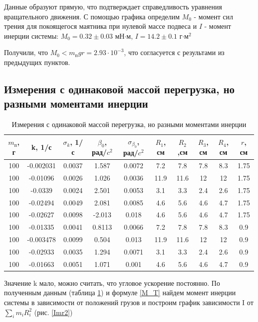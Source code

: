 \documentclass[a4paper,12pt]{article} %
\begin{document}
Данные образуют прямую, что подтверждает справедливость уравнения вращательного движения. С помощью графика определим $M_0$ - момент сил трения для покоящегося маятника при нулевой массе подвеса и $I$ - момент инерции системы: $M_0 = 0.32 \pm 0.03 $ мН$\cdot$м, $I = 14.2 \pm 0.1$ г$\cdot \text{м}^2$

Получили, что $M_0 < m_\text{п}gr=2.93 \cdot 10^{-3}$, что согласуется с результами из предыдущих пунктов.

\subsection{Измерения с одинаковой массой перегрузка, но разными моментами инерции}

\begin{table}
\caption{Измерения с одинаковой массой перегрузка, но разными моментами инерции}
\label{mconst}
\begin{tabular}{|c|c|c|c|c|c|c|c|c|c|}
\hline 
$m_\text{п}$, г & k, 1/с & $\sigma_k$, 1/с & $\beta_0$, рад/$c^2$ & $\sigma_{\beta_0}$, рад/$c^2$ & $R_1$, см & $R_2$,см & $R_3$, см & $R_4$, см & $r$, см \\
\hline
100 & -0.002031 & 0.0037 & 1.587 & 0.0072 & 7.2 & 7.8 & 7.8 & 8.3 & 1.75\\
\hline
100 & -0.01096 & 0.0026 & 1.026 & 0.0036 & 11.9 & 11.6 & 12 & 12 & 1.75\\
\hline
100 & -0.0339 &  0.0024 & 2.501 & 0.0053 & 3.1 & 3.3 & 2.4 & 2.6 & 1.75\\
\hline
100 & -0.02494 & 0.0049 & 2.081 & 0.0085 & 4.6 & 5.6 & 4.6 & 4.7 & 1.75\\
\hline
100 & -0.02627 & 0.0098 & -2.013 & 0.018 & 4.6 & 5.6 & 4.6 & 4.7 & 1.75\\
\hline
100 & -0.01335 & 0.0041 & 0.8113 & 0.0066 & 7.2 & 7.8 & 7.8 & 8.3 & 0.9\\
\hline
100 & -0.003478 & 0.0099 & 0.504 & 0.013 & 11.9 & 11.6 & 12 & 12 & 0.9\\
\hline
100 & -0.02933 & 0.0035 & 1.294 & 0.0071 & 3.1 & 3.3 & 2.4 & 2.6 & 0.9\\
\hline
100 & -0.01663 & 0.0051 & 1.071 & 0.001 & 4.6 & 5.6 & 4.6 & 4.7 & 0.9\\
\hline

\end{tabular} 
\end{table}
Значение k мало, можно считать, что угловое ускорение постоянно. По полученным данным (таблица \ref{mconst}) и формуле \ref{M_T} найдем момент инерции системы в зависимости от положений грузов и построим график зависимости I от $\sum_i m_iR_i^2$ (рис. \ref{Imr2})
\end{document}
